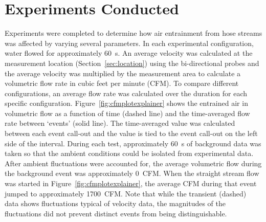 \documentclass[12pt,oneside]{book}
\begin{document}



\chapter{Experiments Conducted}

Experiments were completed to determine how air entrainment from hose streams was affected by varying several parameters. In each experimental configuration, water flowed for approximately 60~s. An average velocity was calculated at the measurement location (Section~\ref{sec:location}) using the bi-directional probes and the average velocity was multiplied by the measurement area to calculate a volumetric flow rate in cubic feet per minute (CFM). To compare different configurations, an average flow rate was calculated over the duration for each specific configuration. Figure~\ref{fig:cfmplotexplainer} shows the entrained air in volumetric flow as a function of time (dashed line) and the time-averaged flow rate between `events' (solid line). The time-averaged value was calculated between each event call-out and the value is tied to the event call-out on the left side of the interval. During each test, approximately 60~s of background data was taken so that the ambient conditions could be isolated from experimental data. After ambient fluctuations were accounted for, the average volumetric flow during the background event was approximately 0~CFM. When the straight stream flow was started in Figure~\ref{fig:cfmplotexplainer}, the average CFM during that event jumped to approximately 1700~CFM. Note that while the transient (dashed) data shows fluctuations typical of velocity data, the magnitudes of the fluctuations did not prevent distinct events from being distinguishable.
\end{document}
